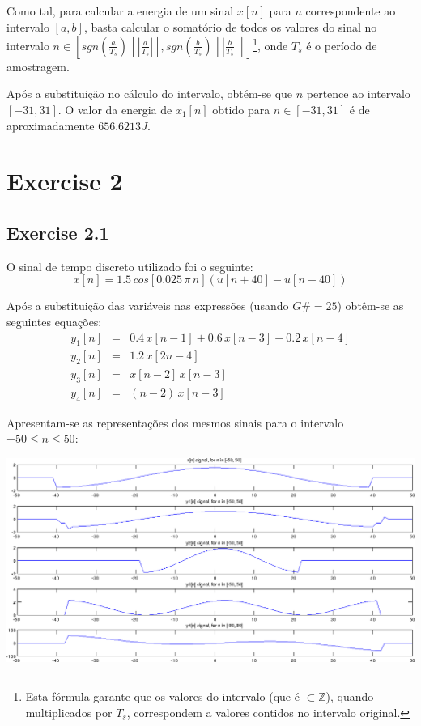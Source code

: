 \documentclass[a4paper]{article}
\begin{document}
\noindent Como tal, para calcular a energia de um sinal $x[n]$ para $n$ correspondente ao intervalo $[a, b]$, basta calcular o somatório de todos os valores do sinal no intervalo $n \in \left[ sgn\left(\frac{a}{T_{s}}\right) \, \left\lfloor \left| \frac{a}{T_{s}} \right| \right\rfloor, sgn\left(\frac{b}{T_{s}}\right) \, \left\lfloor \left| \frac{b}{T_{s}} \right| \right\rfloor \right]$\footnote{Esta fórmula garante que os valores do intervalo (que é $\subset \mathbb{Z}$), quando multiplicados por $T_{s}$, correspondem a valores contidos no intervalo original.}, onde $T_{s}$ é o período de amostragem.

\noindent Após a substituição no cálculo do intervalo, obtém-se que $n$ pertence ao intervalo $[-31, 31]$. O valor da energia de $x_1[n]$ obtido para $n \in [-31, 31]$ é de aproximadamente $656.6213J$.
\clearpage

\section{Exercise 2}
\subsection{Exercise 2.1}
\noindent O sinal de tempo discreto utilizado foi o seguinte:
\begin{equation}
x[n] = 1.5 \, cos[0.025 \, \pi \, n] (u[n + 40] - u[n - 40])
\end{equation}

Após a substituição das variáveis nas expressões (usando $G\# = 25$) obtêm-se as seguintes equações:
\begin{eqnarray}
	y_{1}[n] & = & 0.4 \, x[n - 1] + 0.6 \, x[n - 3] - 0.2 \, x[n - 4] \\
	y_{2}[n] & = & 1.2 \, x[2n - 4] \\
	y_{3}[n] & = & x[n - 2] \, x[n - 3] \\
	y_{4}[n] & = & (n - 2) \, x[n - 3]
\end{eqnarray}

\noindent Apresentam-se as representações dos mesmos sinais para o intervalo $-50 \leq n \leq 50$:

\begin{center}
	\includegraphics[scale=0.45]{images/ex21.png}
	\label{fig:ex21}
\end{center}
\end{document}

